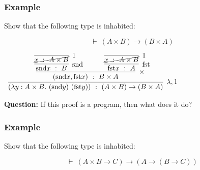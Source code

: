 \documentclass{beamer}
\theoremstyle{indentDefn} \newtheorem{defn}[]{Definition}
\begin{document}
\begin{frame}
  \frametitle{Example}

  Show that the following type is inhabited:

  $$ \vdash \ (A \times B) \to (B \times A)$$

  \vspace{0.5cm}

  \begin{center}
    $\begin{array}{c}
      \infer[\lambda, 1]{(\lambda y : A\times B. \ (\snd y) \ (\fst y)) \ : \ (A\times B)\to(B \times A)}
        {\infer[\times]{(\snd x, \fst x) \ : \ B \times A}
          {\infer[\snd]{\snd x \ : \ B}{\infer[1]{\cancel{x \ : \ A\times B}}{}} \quad & \quad \infer[\fst]{\fst x \ : \ A}{\infer[1]{\cancel{x \ : \ A\times B}}{}}}}
    \end{array}$
  \end{center}

  \vspace{0.5cm}

  {\bf Question:} If this proof is a program, then what does it do? 

  \vspace{2cm}

\end{frame}

\begin{frame}
  \frametitle{Example}

  Show that the following type is inhabited:

  $$ \vdash \ (A \times B \to C) \to (A \to (B \to C))$$

  \vspace{6.5cm}


\end{frame}
\end{document}
